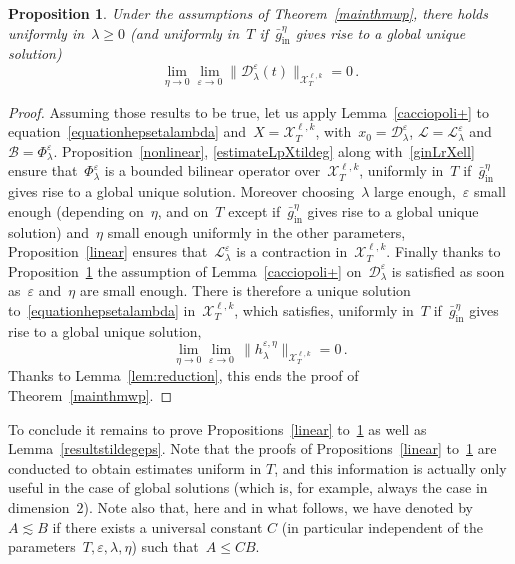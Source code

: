 \documentclass[11pt]{article}
\newtheorem{prop}[theo]{Proposition}
\theoremstyle{definition}
\numberwithin{equation}{section}
\numberwithin{figure}{section}
\numberwithin{table}{section}
\newcommand*\eps{{\varepsilon}}
\newcommand*\e{{\varepsilon}}
\DeclareMathOperator{\inn}{in}
\begin{document}
\begin{prop}\label{limitdatawp}
Under the assumptions of Theorem~\ref{mainthmwp}, there holds uniformly in~$\lambda\geq 0$ (and uniformly in~$T$ if~$\bar g^\eta_{\inn}$ gives rise to a global unique solution)
\[
\lim_{\eta\to 0} \lim_{\eps\to 0} \big\| \mathcal{D}_\lambda^{\e}(t) \big\|_{\mathcal{X}_T^{\ell,k}}=0\,.
\]
\end{prop}
\begin{proof}
Assuming those results to be true, let us apply Lemma~\ref{cacciopoli+} to equation~\eqref{equationhepsetalambda} and~$X ={\mathcal X}_T^{\ell,k}$, with~$x_{0} = \mathcal{D}_\lambda^{\e}$, ${\mathcal L} = {\mathcal L} _\lambda ^{\e}$ and~${\mathcal B} = \Phi_\lambda ^{\e}$. Proposition~\ref{nonlinear}, \eqref{estimateLpXtildeg} along with~\eqref{ginLrXell} ensure that~$ \Phi ^{\e} _\lambda$ is a bounded bilinear operator over~$\mathcal{X}_T^{\ell,k} $, uniformly in~$T$ if~$\bar g_{\inn}^\eta$ gives rise to a global unique solution. Moreover choosing~$\lambda$ large enough,~$\e$ small enough (depending on~$\eta$, and on~$T$ except if~$\bar g^\eta_{\inn}$ gives rise to a global unique solution) and~$\eta$ small enough uniformly in the other parameters, Proposition~\ref{linear} ensures that~$ {\mathcal L}_\lambda ^{\e} $ is a contraction in~${\mathcal X}_T^{\ell,k}$. Finally thanks to Proposition~\ref{limitdatawp} the assumption of Lemma~\ref{cacciopoli+} on~$\mathcal{D}^{\e}_\lambda $ is satisfied as soon as~$\e$ and~$\eta$ are small enough. There is therefore a unique solution to~\eqref{equationhepsetalambda} in~$\mathcal{X}_T^{\ell,k}$, which satisfies, uniformly in~$T$ if~$\bar g^\eta_{\inn}$ gives rise to a global unique solution,
\begin{equation}\label{shorttimeestimate}
\lim_{\eta\to 0} \lim_{\eps\to 0} \, \big\| h_\lambda^{\e,\eta}
\big\|_{\mathcal{X}_T^{\ell,k}} = 0 \,.
\end{equation}
Thanks to Lemma~\ref{lem:reduction}, this ends the proof of Theorem~\ref{mainthmwp}.
\end{proof}

To conclude it remains to prove Propositions~\ref{linear} to~\ref{limitdatawp} as well as Lemma~\ref{resultstildegeps}. Note that the proofs of Propositions~\ref{linear} to~\ref{limitdatawp} are conducted to obtain estimates uniform in $T$, and this information is actually only useful in the case of global solutions (which is, for example, always the case in dimension~$2$). Note also that, here and in what follows, we have denoted by~$A \lesssim B$ if there exists a universal constant $C$ (in particular independent of the parameters~$T,\eps,\lambda,\eta$) such that~$A \leq CB$.
\end{document}
